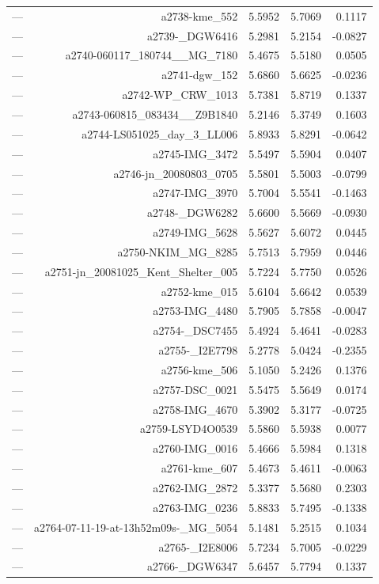\begin{table}[htbp]
\begin{tabular}{lrrrr}
— & a2738-kme_552 & 5.5952 & 5.7069 & 0.1117 \\
— & a2739-_DGW6416 & 5.2981 & 5.2154 & -0.0827 \\
— & a2740-060117_180744__MG_7180 & 5.4675 & 5.5180 & 0.0505 \\
— & a2741-dgw_152 & 5.6860 & 5.6625 & -0.0236 \\
— & a2742-WP_CRW_1013 & 5.7381 & 5.8719 & 0.1337 \\
— & a2743-060815_083434__Z9B1840 & 5.2146 & 5.3749 & 0.1603 \\
— & a2744-LS051025_day_3_LL006 & 5.8933 & 5.8291 & -0.0642 \\
— & a2745-IMG_3472 & 5.5497 & 5.5904 & 0.0407 \\
— & a2746-jn_20080803_0705 & 5.5801 & 5.5003 & -0.0799 \\
— & a2747-IMG_3970 & 5.7004 & 5.5541 & -0.1463 \\
— & a2748-_DGW6282 & 5.6600 & 5.5669 & -0.0930 \\
— & a2749-IMG_5628 & 5.5627 & 5.6072 & 0.0445 \\
— & a2750-NKIM_MG_8285 & 5.7513 & 5.7959 & 0.0446 \\
— & a2751-jn_20081025_Kent_Shelter_005 & 5.7224 & 5.7750 & 0.0526 \\
— & a2752-kme_015 & 5.6104 & 5.6642 & 0.0539 \\
— & a2753-IMG_4480 & 5.7905 & 5.7858 & -0.0047 \\
— & a2754-_DSC7455 & 5.4924 & 5.4641 & -0.0283 \\
— & a2755-_I2E7798 & 5.2778 & 5.0424 & -0.2355 \\
— & a2756-kme_506 & 5.1050 & 5.2426 & 0.1376 \\
— & a2757-DSC_0021 & 5.5475 & 5.5649 & 0.0174 \\
— & a2758-IMG_4670 & 5.3902 & 5.3177 & -0.0725 \\
— & a2759-LSYD4O0539 & 5.5860 & 5.5938 & 0.0077 \\
— & a2760-IMG_0016 & 5.4666 & 5.5984 & 0.1318 \\
— & a2761-kme_607 & 5.4673 & 5.4611 & -0.0063 \\
— & a2762-IMG_2872 & 5.3377 & 5.5680 & 0.2303 \\
— & a2763-IMG_0236 & 5.8833 & 5.7495 & -0.1338 \\
— & a2764-07-11-19-at-13h52m09s-_MG_5054 & 5.1481 & 5.2515 & 0.1034 \\
— & a2765-_I2E8006 & 5.7234 & 5.7005 & -0.0229 \\
— & a2766-_DGW6347 & 5.6457 & 5.7794 & 0.1337 \\

\end{tabular}
\end{table}
